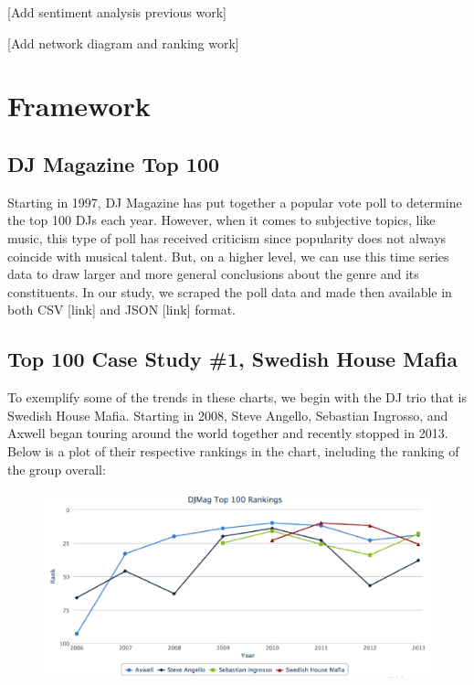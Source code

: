 \documentclass[12pt]{dalcsthesis}
\begin{document}
[Add sentiment analysis previous work]

[Add network diagram and ranking work]

\chapter{Framework}

\section{DJ Magazine Top 100}

Starting in 1997, DJ Magazine has put together a popular vote poll to determine the top 100 DJs each year. However, when it comes to subjective topics, like music, this type of poll has received criticism since popularity does not always coincide with musical talent. But, on a higher level, we can use this time series data to draw larger and more general conclusions about the genre and its constituents. In our study, we scraped the poll data and made then available in both CSV [link] and JSON [link] format. 

\section{Top 100 Case Study \#1, Swedish House Mafia}

To exemplify some of the trends in these charts, we begin with the DJ trio that is Swedish House Mafia. Starting in 2008, Steve Angello, Sebastian Ingrosso, and Axwell began touring around the world together and recently stopped in 2013. Below is a plot of their respective rankings in the chart, including the ranking of the group overall: \newpage

\begin{figure}[h]
\includegraphics[scale=.65]{shm_graph}
\centering
\end{figure}
\end{document}
